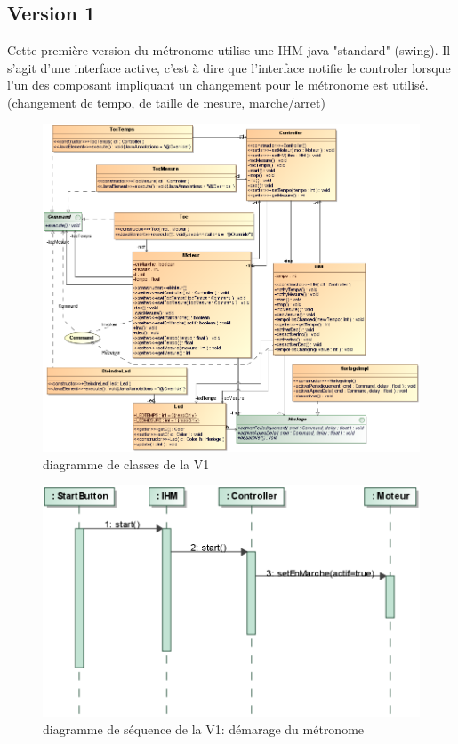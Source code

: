 \documentclass{article}
\begin{document}
\subsection{Version 1}
Cette première version du métronome utilise une IHM java "standard" (swing). Il s'agit d'une interface active, c'est à dire que l'interface notifie le controler lorsque l'un des composant impliquant un changement pour le métronome est utilisé. (changement de tempo, de taille de mesure, marche/arret)
\begin{figure}[h]
   \caption{diagramme de classes de la V1}
   \includegraphics{class_diagram_v1}
\end{figure}
\begin{figure}[h]
   \caption{diagramme de séquence de la V1: démarage du métronome}
   \includegraphics{seq_diagram_v1}
\end{figure}
\end{document}

